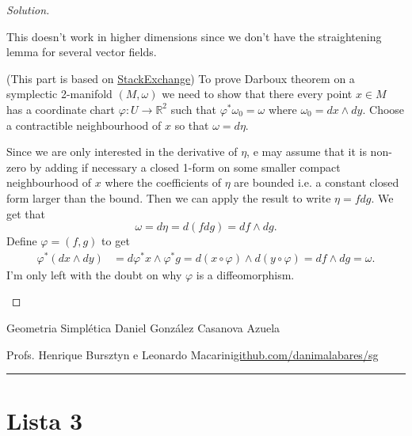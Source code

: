 \begin{proof}[Solution]
\begin{enumerate}[label=\alph*.]
		\begin{remark}
			This doesn't work in higher dimensions since we don't have the straightening lemma for several vector fields.
		\end{remark}

		(This part is based on \href{https://math.stackexchange.com/questions/2853901/darboux-theorem-for-2-dimensional-manifolds}{StackExchange}) To prove Darboux theorem on a symplectic 2-manifold $(M,\omega)$ we need to show that there every point $x \in M$ has a coordinate chart $\varphi :U\to \mathbb{R}^{2}$ such that $\varphi^*\omega_0=\omega$ where $\omega_0=dx\wedge dy$. Choose a contractible neighbourhood of $x$ so that  $\omega=d\eta$.

		Since we are only interested in the derivative of $\eta$, e may assume that it is non-zero by adding if necessary a closed 1-form on some smaller compact neighbourhood of $x$ where the coefficients of $\eta$ are bounded i.e. a constant closed form larger than the bound. Then we can apply the result to write $\eta=fdg$. We get that
		\[\omega=d\eta=d(fdg)=df\wedge dg.\]
		Define $\varphi=(f,g)$ to get
		\begin{align*}
			\varphi^*(dx\wedge dy)&=d\varphi^*x\wedge \varphi^*g=d(x\circ \varphi)\wedge d(y\circ \varphi)=df\wedge dg=\omega.
		\end{align*}
		I'm only left with the doubt on why $\varphi$ is a diffeomorphism.

	\end{enumerate}
\end{proof}

\clearpage
\begin{minipage}{\textwidth}
	\begin{minipage}{1\textwidth}
		Geometria Simpl\'etica \hfill Daniel González Casanova Azuela
		
		{\small Profs. Henrique Bursztyn e Leonardo Macarini\hfill\href{https://github.com/danimalabares/sg}{github.com/danimalabares/sg}}
	\end{minipage}
\end{minipage}\vspace{.2cm}\hrule

\vspace{10pt}
\section{Lista 3}


